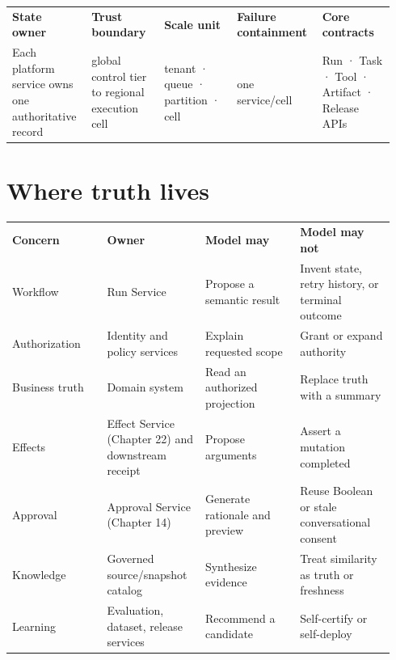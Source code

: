 \BookTableStart
\fontsize{7.2}{9}\selectfont
\begin{tabular}{@{}Y{0.1880\linewidth}Y{0.1880\linewidth}Y{0.1880\linewidth}Y{0.1880\linewidth}Y{0.1880\linewidth}@{}}
\color{white}\bfseries \textbf{State owner} & \color{white}\bfseries \textbf{Trust boundary} & \color{white}\bfseries \textbf{Scale unit} & \color{white}\bfseries \textbf{Failure containment} & \color{white}\bfseries \textbf{Core contracts} \\
Each platform service owns one authoritative record & global control tier to regional execution cell & tenant · queue · partition · cell & one service/cell & Run · Task · Tool · Artifact · Release APIs \\
\end{tabular}
\BookTableEnd

\section{Where truth lives}

\BookTableStart
\fontsize{7.2}{9}\selectfont
\begin{tabular}{@{}Y{0.2350\linewidth}Y{0.2350\linewidth}Y{0.2350\linewidth}Y{0.2350\linewidth}@{}}
\color{white}\bfseries \textbf{Concern} & \color{white}\bfseries \textbf{Owner} & \color{white}\bfseries \textbf{Model may} & \color{white}\bfseries \textbf{Model may not} \\
Workflow & Run Service & Propose a semantic result & Invent state, retry history, or terminal outcome \\
Authorization & Identity and policy services & Explain requested scope & Grant or expand authority \\
Business truth & Domain system & Read an authorized projection & Replace truth with a summary \\
Effects & Effect Service (Chapter 22) and downstream receipt & Propose arguments & Assert a mutation completed \\
Approval & Approval Service (Chapter 14) & Generate rationale and preview & Reuse Boolean or stale conversational consent \\
Knowledge & Governed source/snapshot catalog & Synthesize evidence & Treat similarity as truth or freshness \\
Learning & Evaluation, dataset, release services & Recommend a candidate & Self-certify or self-deploy \\
\end{tabular}
\BookTableEnd

